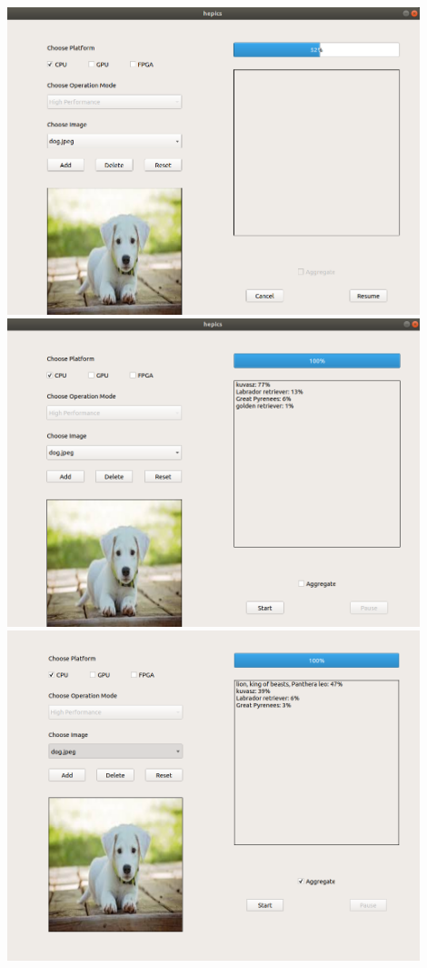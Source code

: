 \documentclass[parskip=full]{scrartcl}
\begin{document}
\includegraphics[width=0.9\textwidth, center]{screen4}
\includegraphics[width=0.9\textwidth, center]{screen5}
\includegraphics[width=0.9\textwidth, center]{screen6}
\end{document}
